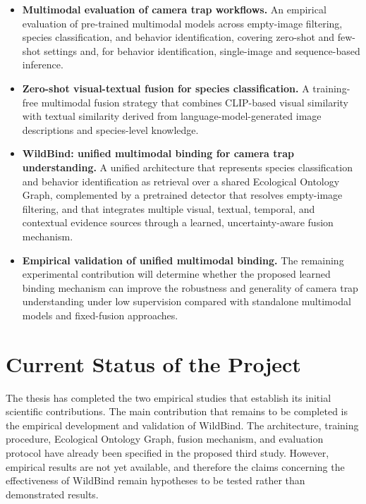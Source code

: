 \begin{itemize}

\item \textbf{Multimodal evaluation of camera trap workflows.} An empirical evaluation of pre-trained multimodal models across empty-image filtering, species classification, and behavior identification, covering zero-shot and few-shot settings and, for behavior identification, single-image and sequence-based inference.

\item \textbf{Zero-shot visual-textual fusion for species classification.} A training-free multimodal fusion strategy that combines CLIP-based visual similarity with textual similarity derived from language-model-generated image descriptions and species-level knowledge.

\item \textbf{WildBind: unified multimodal binding for camera trap understanding.} A unified architecture that represents species classification and behavior identification as retrieval over a shared Ecological Ontology Graph, complemented by a pretrained detector that resolves empty-image filtering, and that integrates multiple visual, textual, temporal, and contextual evidence sources through a learned, uncertainty-aware fusion mechanism.

\item \textbf{Empirical validation of unified multimodal binding.} The remaining experimental contribution will determine whether the proposed learned binding mechanism can improve the robustness and generality of camera trap understanding under low supervision compared with standalone multimodal models and fixed-fusion approaches.

\end{itemize}

\section{Current Status of the Project}\label{sec:current_status}

The thesis has completed the two empirical studies that establish its initial scientific contributions. The main contribution that remains to be completed is the empirical development and validation of WildBind. The architecture, training procedure, Ecological Ontology Graph, fusion mechanism, and evaluation protocol have already been specified in the proposed third study. However, empirical results are not yet available, and therefore the claims concerning the effectiveness of WildBind remain hypotheses to be tested rather than demonstrated results.

